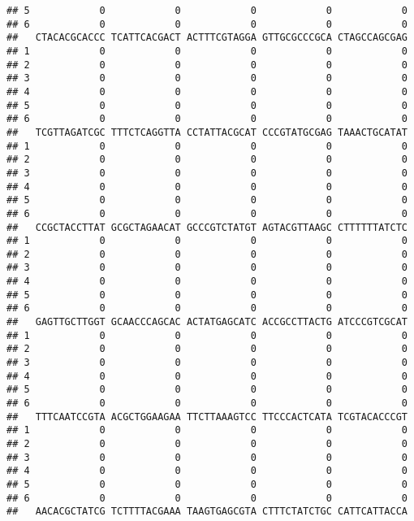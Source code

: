 \documentclass[]{article}
\begin{document}
\begin{verbatim}
## 5            0            0            0            0            0
## 6            0            0            0            0            0
##   CTACACGCACCC TCATTCACGACT ACTTTCGTAGGA GTTGCGCCCGCA CTAGCCAGCGAG
## 1            0            0            0            0            0
## 2            0            0            0            0            0
## 3            0            0            0            0            0
## 4            0            0            0            0            0
## 5            0            0            0            0            0
## 6            0            0            0            0            0
##   TCGTTAGATCGC TTTCTCAGGTTA CCTATTACGCAT CCCGTATGCGAG TAAACTGCATAT
## 1            0            0            0            0            0
## 2            0            0            0            0            0
## 3            0            0            0            0            0
## 4            0            0            0            0            0
## 5            0            0            0            0            0
## 6            0            0            0            0            0
##   CCGCTACCTTAT GCGCTAGAACAT GCCCGTCTATGT AGTACGTTAAGC CTTTTTTATCTC
## 1            0            0            0            0            0
## 2            0            0            0            0            0
## 3            0            0            0            0            0
## 4            0            0            0            0            0
## 5            0            0            0            0            0
## 6            0            0            0            0            0
##   GAGTTGCTTGGT GCAACCCAGCAC ACTATGAGCATC ACCGCCTTACTG ATCCCGTCGCAT
## 1            0            0            0            0            0
## 2            0            0            0            0            0
## 3            0            0            0            0            0
## 4            0            0            0            0            0
## 5            0            0            0            0            0
## 6            0            0            0            0            0
##   TTTCAATCCGTA ACGCTGGAAGAA TTCTTAAAGTCC TTCCCACTCATA TCGTACACCCGT
## 1            0            0            0            0            0
## 2            0            0            0            0            0
## 3            0            0            0            0            0
## 4            0            0            0            0            0
## 5            0            0            0            0            0
## 6            0            0            0            0            0
##   AACACGCTATCG TCTTTTACGAAA TAAGTGAGCGTA CTTTCTATCTGC CATTCATTACCA

\end{verbatim}
\end{document}
